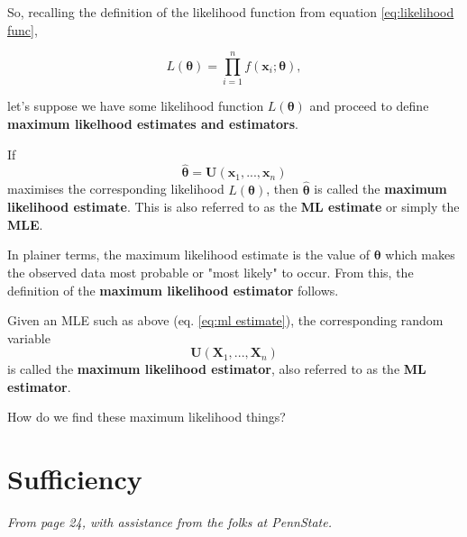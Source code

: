 \bigskip

So, recalling the definition of the likelihood function from equation \ref{eq:likelihood func}, 

\begin{equation*}
    L(\bm{\theta}) = \prod_{i=1}^n f(\bm{x}_i;\bm{\theta}),
\end{equation*}

let's suppose we have some likelihood function \(L(\bm{\theta})\) and proceed to define \textbf{maximum likelhood estimates and estimators}. 

\begin{definition}\label{defn:ml estimate}
    If 
    \begin{equation}\label{eq:ml estimate}
        \hat{\bm{\theta}} = \bm{U}(\bm{x}_1,...,\bm{x}_n)
    \end{equation}
    maximises the corresponding likelihood \(L(\bm{\theta})\), then \(\hat{\bm{\theta}}\) is called the \textbf{maximum likelihood estimate}.
    This is also referred to as the \textbf{ML estimate} or simply the \textbf{MLE}.
\end{definition}

In plainer terms, the maximum likelihood estimate is the value of \(\bm{\theta}\) which makes the observed data most probable or "most likely" to occur. \autocite{rice}
From this, the definition of the \textbf{maximum likelihood estimator} follows.

\begin{definition}\label{defn:ml estimator}
    Given an MLE such as above (eq. \ref{eq:ml estimate}), the corresponding random variable
    \begin{equation}\label{eq:ml estimator}
        \bm{U}(\bm{X}_1,...,\bm{X}_n)
    \end{equation}
    is called the \textbf{maximum likelihood estimator}, also referred to as the \textbf{ML estimator}.
\end{definition}

How do we find these maximum likelihood things?

\section{Sufficiency}\label{sec:sufficiency}

\textit{From page 24, with assistance from the folks at PennState\autocite{penn415}.}



